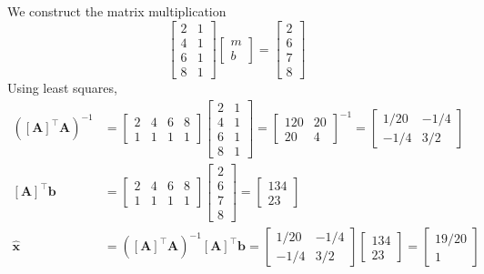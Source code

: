 \documentclass[]{article}
\renewcommand{\vec}[1]{\bm{#1}}
\newcommand{\unit}[1]{\vec{\hat{#1}}}
\newcommand{\tpose}[1]{\left[#1\right]^{\! \top}}
\begin{document}
\subsection{}

We construct the matrix multiplication
\begin{equation}
	\begin{bmatrix}
	2 & 1 \\
	4 & 1 \\
	6 & 1 \\
	8 & 1
	\end{bmatrix}
	\begin{bmatrix}
	m \\
	b
	\end{bmatrix} = 
	\begin{bmatrix}
	2 \\
	6 \\
	7 \\
	8
	\end{bmatrix}
\end{equation}
Using least squares, 
\begin{align}
	(\tpose{\vec{A}} \vec{A})^{-1} &= \begin{bmatrix}
	2 & 4 & 6 & 8 \\
	1 & 1 & 1 & 1
	\end{bmatrix}
	\begin{bmatrix}
	2 & 1 \\
	4 & 1 \\
	6 & 1 \\
	8 & 1
	\end{bmatrix} = \begin{bmatrix}
	120 & 20 \\
	20 & 4
	\end{bmatrix}^{-1} = \begin{bmatrix}
	1/20 & -1/4 \\
	-1/4 & 3/2
	\end{bmatrix} \\
	\tpose{\vec{A}} \vec{b} &= \begin{bmatrix}
	2 & 4 & 6 & 8 \\
	1 & 1 & 1 & 1
	\end{bmatrix}
	\begin{bmatrix}
	2 \\
	6 \\
	7 \\ 
	8
	\end{bmatrix} = \begin{bmatrix}
	134 \\
	23
	\end{bmatrix} \\
	\unit{x} &= (\tpose{\vec{A}} \vec{A})^{-1} \tpose{\vec{A}} \vec{b} = 
	\begin{bmatrix}
	1/20 & -1/4 \\
	-1/4 & 3/2
	\end{bmatrix}
	\begin{bmatrix}
	134 \\
	23
	\end{bmatrix} = \begin{bmatrix}
	19 / 20 \\
	1
	\end{bmatrix}
\end{align}
\end{document}
